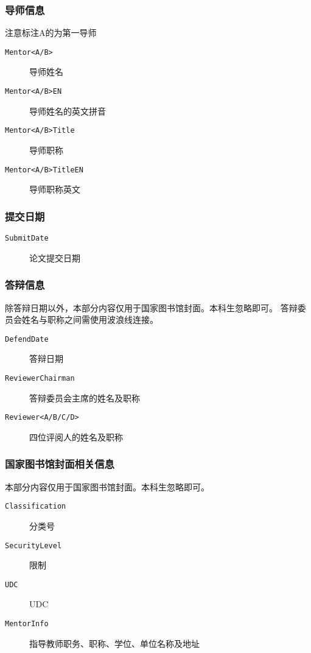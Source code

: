 \subsubsection{导师信息}
注意标注A的为第一导师
\begin{description}
    \item[\texttt{Mentor<A/B>}] 导师姓名
    \item[\texttt{Mentor<A/B>EN}] 导师姓名的英文拼音  
    \item[\texttt{Mentor<A/B>Title}] 导师职称
    \item[\texttt{Mentor<A/B>TitleEN}] 导师职称英文
\end{description}

\subsubsection{提交日期}
\begin{description}
    \item[\texttt{SubmitDate}] 论文提交日期
\end{description}

\subsubsection{答辩信息}

除答辩日期以外，本部分内容仅用于国家图书馆封面。本科生忽略即可。
答辩委员会姓名与职称之间需使用波浪线连接。

\begin{description}
    \item[\texttt{DefendDate}] 答辩日期
    \item[\texttt{ReviewerChairman}] 答辩委员会主席的姓名及职称 
    \item[\texttt{Reviewer<A/B/C/D>}] 四位评阅人的姓名及职称  
\end{description}

\subsubsection{国家图书馆封面相关信息}

本部分内容仅用于国家图书馆封面。本科生忽略即可。

\begin{description}
    \item[\texttt{Classification}] 分类号
    \item[\texttt{SecurityLevel}] 限制  
    \item[\texttt{UDC}] UDC
    \item[\texttt{MentorInfo}] 指导教师职务、职称、学位、单位名称及地址
\end{description}


